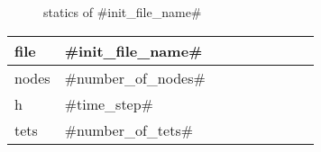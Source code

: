 
\begin{figure}
  \centering
  \caption{statics of #init_file_name#}
  \label{en_f}
\end{figure}

\begin{center}
  \begin{tabular}{|l*{8}{|l}}
    \hline
	file & #init_file_name# \\ \hline
	nodes & #number_of_nodes# \\ \hline
	h & #time_step# \\ \hline
	tets & #number_of_tets# \\ \hline
  \end{tabular}
\end{center}
